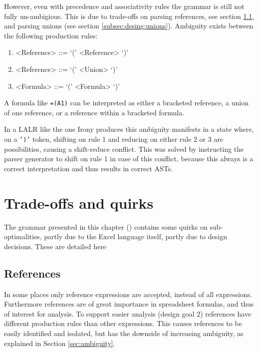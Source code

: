 However, even with precedence and associativity rules the grammar is still not fully un-ambigious.
This is due to trade-offs on parsing references, see section \ref{tradeoff:references}, and parsing unions (see section \ref{subsec:desing:unions}).
Ambiguity exists between the following production rules:
\begin{enumerate}
\item \begin{grammar}<Reference> ::= `(' <Reference> `)'\end{grammar}
\item \begin{grammar}<Reference> ::= `(' <Union> `)'\end{grammar}
\item \begin{grammar}<Formula> ::= `(' <Formula> `)'\end{grammar}
\end{enumerate}

A formula like \texttt{=(A1)} can be interpreted as either a bracketed reference, a union of one reference, or a reference within a bracketed formula.

In a LALR like the one Irony produces this ambiguity manifests in a state where, on a \texttt{')'} token, shifting on rule 1 and reducing on either rule 2 or 3 are possibilities, causing a shift-reduce conflict.
This was solved by instructing the parser generator to shift on rule 1 in case of this conflict, because this always is a correct interpretation and thus results in correct ASTs.

\section{Trade-offs and quirks}

The grammar presented in this chapter () contains some quirks on sub-optimalities, partly due to the Excel language itself, partly due to design decisions.
These are detailed here

\subsection{\textbf{References}}
\label{tradeoff:references}

In some places only reference expressions are accepted, instead of all expressions.
Furthermore references are of great importance in spreadsheet formulas, and thus of interest for analysis.
To support easier analysis (design goal 2) references have different production rules than other expressions.
This causes references to be easily identified and isolated, but has the downside of increasing ambiguity, as explained in Section \ref{sec:ambiguity}. 


